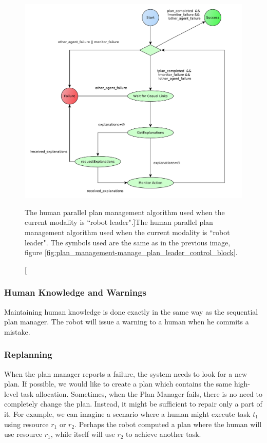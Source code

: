 \begin{figure}[ht!]
 \centering
 \includegraphics[scale=0.5]{img/plan_management/manage_plan_leader_humans.pdf}
 \caption[The human parallel plan management algorithm used when the current modality is ``robot leader".]{The human parallel plan management algorithm used when the current modality is ``robot leader". The symbols used are the same as in the previous image, figure \ref{fig:plan_management-manage_plan_leader_control_block}.}
 \label{fig:plan_management-manage_plan_leader_humans}
 \end{figure}


\subsubsection{Human Knowledge and Warnings}
Maintaining human knowledge is done exactly in the same way as the sequential plan manager. The robot will issue a warning to a human when he commits a mistake.

\subsubsection{Replanning}
When the plan manager reports a failure, the system needs to look for a new plan. If possible, we would like to create a plan which contains the same high-level task allocation. Sometimes, when the Plan Manager fails, there is no need to completely change the plan. Instead, it might be sufficient to repair only a part of it. For example, we can imagine a scenario where a human might execute task $t_1$ using resource $r_1$ or $r_2$. Perhaps the robot computed a plan where the human will use resource $r_1$, while itself will use $r_2$ to achieve another task.

